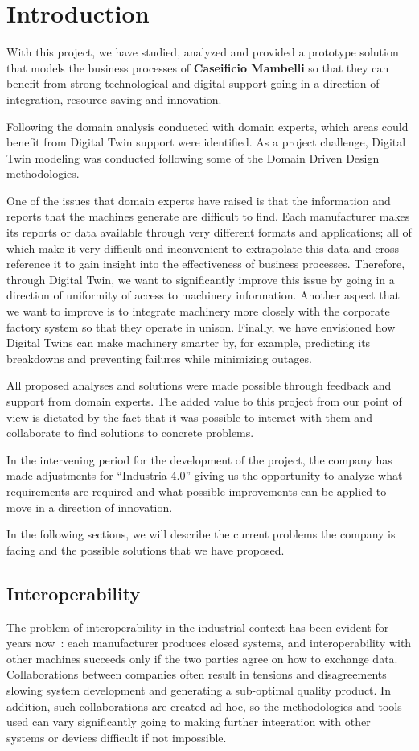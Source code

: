 \chapter{Introduction}
With this project, we have studied, analyzed and provided a prototype solution that models the business processes of \textbf{Caseificio Mambelli} so
that they can benefit from strong technological and digital support going in a direction of integration, resource-saving and innovation.

Following the domain analysis conducted with domain experts, which areas could benefit from Digital Twin support were identified.
As a project challenge, Digital Twin modeling was conducted following some of the Domain Driven Design methodologies.

One of the issues that domain experts have raised is that the information and reports that the machines generate are difficult to find.
Each manufacturer makes its reports or data available through very different formats and applications; all of which make it very difficult
and inconvenient to extrapolate this data and cross-reference it to gain insight into the effectiveness of business processes.
Therefore, through Digital Twin, we want to significantly improve this issue by going in a direction of uniformity of access to machinery
information.
Another aspect that we want to improve is to integrate machinery more closely with the corporate factory system so that they operate in unison.
Finally, we have envisioned how Digital Twins can make machinery smarter by, for example, predicting its breakdowns and preventing failures while
minimizing outages.

All proposed analyses and solutions were made possible through feedback and support from domain experts.
The added value to this project from our point of view is dictated by the fact that it was possible to interact with them and collaborate to find
solutions to concrete problems.

In the intervening period for the development of the project, the company has made adjustments for ``Industria 4.0'' giving us the opportunity to
analyze what requirements are required and what possible improvements can be applied to move in a direction of innovation.

In the following sections, we will describe the current problems the company is facing and the possible solutions that we have proposed.

\section{Interoperability}
The problem of interoperability in the industrial context has been evident for years now~\cite{LIAO201712434}: each manufacturer produces closed systems, and interoperability with other machines succeeds only if the two parties agree on how to exchange data.
Collaborations between companies often result in tensions and disagreements slowing system development and generating a sub-optimal quality product.
In addition, such collaborations are created ad-hoc, so the methodologies and tools used can vary significantly going to making further integration
with other systems or devices difficult if not impossible.

